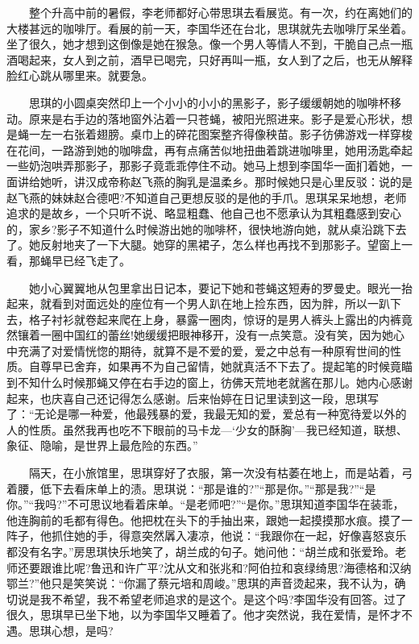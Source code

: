 \documentclass[12pt,UTF8]{ctexbook}
\begin{document}
　　整个升高中前的暑假，李老师都好心带思琪去看展览。有一次，约在离她们的大楼甚远的咖啡厅。看展的前一天，李国华还在台北，思琪就先去咖啡厅呆坐着。坐了很久，她才想到这倒像是她在猴急。像一个男人等情人不到，干脆自己点一瓶酒喝起来，女人到之前，酒早已喝完，只好再叫一瓶，女人到了之后，也无从解释脸红心跳从哪里来。就要急。

　　思琪的小圆桌突然印上一个小小的小小的黑影子，影子缓缓朝她的咖啡杯移动。原来是右手边的落地窗外沾着一只苍蝇，被阳光照进来。影子是爱心形状，想是蝇一左一右张着翅膀。桌巾上的碎花图案整齐得像秧苗。影子彷佛游戏一样穿梭在花间，一路游到她的咖啡盘，再有点痛苦似地扭曲着跳进咖啡里，她用汤匙牵起一些奶泡哄弄那影子，那影子竟乖乖停住不动。她马上想到李国华一面扪着她，一面讲给她听，讲汉成帝称赵飞燕的胸乳是温柔乡。那时候她只是心里反驳：说的是赵飞燕的妹妹赵合德吧?不知道自己更想反驳的是他的手爪。思琪呆呆地想，老师追求的是故乡，一个只听不说、略显粗蠢、他自己也不愿承认为其粗蠢感到安心的，家乡?影子不知道什么时候游出她的咖啡杯，很快地游向她，就从桌沿跳下去了。她反射地夹了一下大腿。她穿的黑裙子，怎么样也再找不到那影子。望窗上一看，那蝇早已经飞走了。

　　她小心翼翼地从包里拿出日记本，要记下她和苍蝇这短寿的罗曼史。眼光一抬起来，就看到对面远处的座位有一个男人趴在地上捡东西，因为胖，所以一趴下去，格子衬衫就卷起来爬在上身，暴露一圈肉，惊讶的是男人裤头上露出的内裤竟然镶着一圈中国红的蕾丝!她缓缓把眼神移开，没有一点笑意。没有笑，因为她心中充满了对爱情恍惚的期待，就算不是不爱的爱，爱之中总有一种原宥世间的性质。自尊早已舍弃，如果再不为自己留情，她就真活不下去了。提起笔的时候竟瞄到不知什么时候那蝇又停在右手边的窗上，彷佛天荒地老就酱在那儿。她内心感谢起来，也庆喜自己还记得怎么感谢。后来怡婷在日记里读到这一段，思琪写了：\enquote{无论是哪一种爱，他最残暴的爱，我最无知的爱，爱总有一种宽待爱以外的人的性质。虽然我再也吃不下眼前的马卡龙---\enquote{少女的酥胸}---我已经知道，联想、象征、隐喻，是世界上最危险的东西。}

　　隔天，在小旅馆里，思琪穿好了衣服，第一次没有枯萎在地上，而是站着，弓着腰，低下去看床单上的渍。思琪说：\enquote{那是谁的?}\enquote{那是你。}\enquote{那是我?}\enquote{是你。}\enquote{我吗?}不可思议地看着床单。\enquote{是老师吧?}\enquote{是你。}思琪知道李国华在装乖，他连胸前的毛都有得色。他把枕在头下的手抽出来，跟她一起摸摸那水痕。摸了一阵子，他抓住她的手，得意突然羼入凄凉，他说：\enquote{我跟你在一起，好像喜怒哀乐都没有名字。}房思琪快乐地笑了，胡兰成的句子。她问他：\enquote{胡兰成和张爱玲。老师还要跟谁比呢?鲁迅和许广平?沈从文和张兆和?阿伯拉和哀绿绮思?海德格和汉纳鄂兰?}他只是笑笑说：\enquote{你漏了蔡元培和周峻。}思琪的声音烫起来，我不认为，确切说是我不希望，我不希望老师追求的是这个。是这个吗?李国华没有回答。过了很久，思琪早已坐下地，以为李国华又睡着了。他才突然说，我在爱情，是怀才不遇。思琪心想，是吗?
\end{document}
